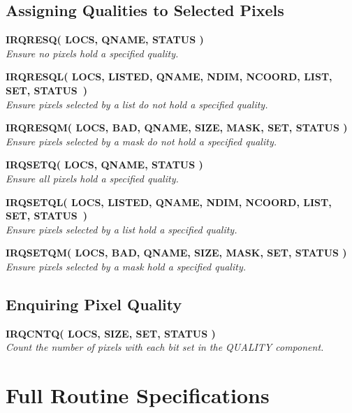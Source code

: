 \documentclass[twoside,11pt]{article}
\newcommand{\noteroutine}[2]{\textbf{#1}\hspace*{\fill}\nopagebreak \\
                             \hspace*{3em}\emph{#2}\hspace*{\fill}\par}
\newcommand{\xlabel}[1]{}
\renewcommand{\_}{\texttt{\symbol{95}}}
\begin{document}
\subsection{Assigning Qualities to Selected Pixels}
\noteroutine{IRQ\_RESQ( LOCS, QNAME, STATUS )}
   {Ensure no pixels hold a specified quality.}
\noteroutine{IRQ\_RESQL( LOCS, LISTED, QNAME, NDIM, NCOORD, LIST, SET,
STATUS~)}
   {Ensure pixels selected by a list do not hold a specified quality.}
\noteroutine{IRQ\_RESQM( LOCS, BAD, QNAME, SIZE, MASK, SET, STATUS )}
   {Ensure pixels selected by a mask do not hold a specified quality.}
\noteroutine{IRQ\_SETQ( LOCS, QNAME, STATUS )}
   {Ensure all pixels hold a specified quality.}
\noteroutine{IRQ\_SETQL( LOCS, LISTED, QNAME, NDIM, NCOORD, LIST, SET,
STATUS~)}
   {Ensure pixels selected by a list hold a specified quality.}
\noteroutine{IRQ\_SETQM( LOCS, BAD, QNAME, SIZE, MASK, SET, STATUS )}
   {Ensure pixels selected by a mask hold a specified quality.}

\subsection{Enquiring Pixel Quality}
\noteroutine{IRQ\_CNTQ( LOCS, SIZE, SET, STATUS )}
   {Count the number of pixels with each bit set in the QUALITY component.}

\newpage
\section {\xlabel{SEC:FULLSPEC}Full Routine Specifications}
\label {SEC:FULLSPEC}
\end{document}
